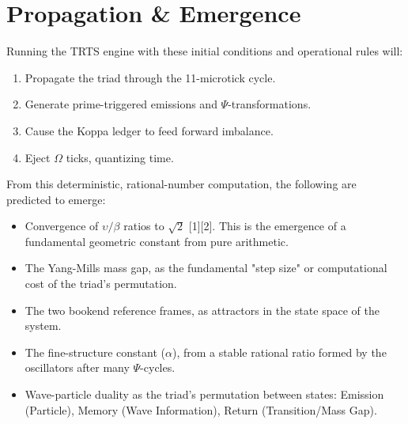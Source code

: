 \documentclass[12pt]{article}
\begin{document}
\section{Propagation \& Emergence}

Running the TRTS engine with these initial conditions and operational rules will:
\begin{enumerate}
    \item Propagate the triad through the 11-microtick cycle.
    \item Generate prime-triggered emissions and $\Psi$-transformations.
    \item Cause the Koppa ledger to feed forward imbalance.
    \item Eject $\Omega$ ticks, quantizing time.
\end{enumerate}
From this deterministic, rational-number computation, the following are predicted to emerge:
\begin{itemize}
    \item Convergence of $\upsilon/\beta$ ratios to $\sqrt{2}$ [1][2]. This is the emergence of a fundamental geometric constant from pure arithmetic.
    \item The Yang-Mills mass gap, as the fundamental "step size" or computational cost of the triad's permutation.
    \item The two bookend reference frames, as attractors in the state space of the system.
    \item The fine-structure constant ($\alpha$), from a stable rational ratio formed by the oscillators after many $\Psi$-cycles.
    \item Wave-particle duality as the triad's permutation between states: Emission (Particle), Memory (Wave Information), Return (Transition/Mass Gap).
\end{itemize}
\end{document}
